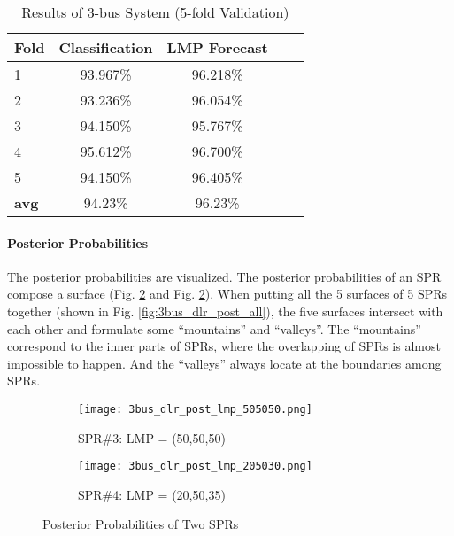 \documentclass[letterpaper, 11pt]{article}
\theoremstyle{plain}
\theoremstyle{definition}
\begin{document}
\begin{table}[htbp]
  \caption{Results of 3-bus System (5-fold Validation)}
  \label{tab:classification_accuracy_3bus}
  \centering

  \begin{tabular}{l|cccc}
  \hline

  \hline
  \textbf{Fold} & \textbf{Classification} & \textbf{LMP Forecast}  \\
  \hline
  1 & 93.967\% & 96.218\% \\
  2 & 93.236\% & 96.054\% \\
  3 & 94.150\% & 95.767\%\\
  4 & 95.612\% & 96.700\%\\
  5 & 94.150\% & 96.405\%\\
  \hline
  \textbf{avg} & 94.23\% & 96.23\%\\
  \hline

  \hline
  \end{tabular}
\end{table}



\paragraph{Posterior Probabilities} \label{par:posterior_probability_estimation}
The posterior probabilities are visualized. 
The posterior probabilities of an SPR compose a surface (Fig. \ref{fig:3bus_dlr_post_lmp_205030} and Fig. \ref{fig:3bus_dlr_post_lmp_205030}). When putting all the 5 surfaces of 5 SPRs together (shown in Fig. \ref{fig:3bus_dlr_post_all}), the five surfaces intersect with each other and formulate some ``mountains'' and ``valleys''. The ``mountains'' correspond to the inner parts of SPRs, where the overlapping of SPRs is almost impossible to happen. And the  ``valleys'' always locate at the boundaries among SPRs.

\begin{figure}[htbp]
  \centering
  \begin{subfigure}[t]{0.49\linewidth}
  \centering
  \texttt{[image: 3bus\_dlr\_post\_lmp\_505050.png]}
  \caption{SPR\#3: LMP = (50,50,50)}
  \label{fig:3bus_dlr_post_lmp_505050}
  \end{subfigure}
  \begin{subfigure}[t]{0.49\linewidth}
  \centering
  \texttt{[image: 3bus\_dlr\_post\_lmp\_205030.png]}
  \caption{SPR\#4: LMP = (20,50,35)}
  \label{fig:3bus_dlr_post_lmp_205030}
  \end{subfigure} 
  \caption{Posterior Probabilities of Two SPRs}  
  \label{fig:visualize_posteriors} 
\end{figure}
\end{document}

